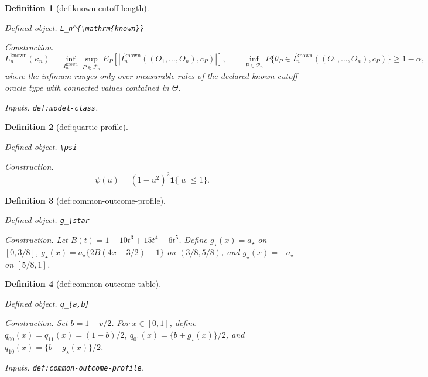\documentclass{article}
\newtheorem{definition}{Definition}
\begin{document}
\begin{definition}[def:known-cutoff-length]\label{def:known-cutoff-length}
\par\smallskip\noindent\emph{Defined object.} \texttt{L\_\allowbreak{}n\textasciicircum{}\{\textbackslash{}\allowbreak{}mathrm\{known\}\allowbreak{}\}\allowbreak{}}
\par\smallskip\noindent\emph{Construction.} \[L_n^{\mathrm{known}}(\kappa_n)=\inf_{I_n^{\mathrm{known}}}\sup_{P\in\mathcal P_n}E_P[|I_n^{\mathrm{known}}((O_1,\ldots,O_n),c_P)|],\qquad \inf_{P\in\mathcal P_n}P\{\theta_P\in I_n^{\mathrm{known}}((O_1,\ldots,O_n),c_P)\}\ge1-\alpha,\] where the infimum ranges only over measurable rules of the declared known-cutoff oracle type with connected values contained in \(\Theta\).
\par\smallskip\noindent\emph{Inputs.} \texttt{def:\allowbreak{}model-\allowbreak{}class}.
\end{definition}

\begin{definition}[def:quartic-profile]\label{def:quartic-profile}
\par\smallskip\noindent\emph{Defined object.} \texttt{\textbackslash{}\allowbreak{}psi}
\par\smallskip\noindent\emph{Construction.} \[\psi(u)=(1-u^2)^2\mathbf 1\{|u|\le1\}.\]
\end{definition}

\begin{definition}[def:common-outcome-profile]\label{def:common-outcome-profile}
\par\smallskip\noindent\emph{Defined object.} \texttt{g\_\allowbreak{}\textbackslash{}\allowbreak{}star}
\par\smallskip\noindent\emph{Construction.} Let \(B(t)=1-10t^3+15t^4-6t^5\). Define \(g_\star(x)=a_\star\) on \([0,3/8]\), \(g_\star(x)=a_\star\{2B(4x-3/2)-1\}\) on \((3/8,5/8)\), and \(g_\star(x)=-a_\star\) on \([5/8,1]\).
\end{definition}

\begin{definition}[def:common-outcome-table]\label{def:common-outcome-table}
\par\smallskip\noindent\emph{Defined object.} \texttt{q\_\allowbreak{}\{a,\allowbreak{}b\}\allowbreak{}}
\par\smallskip\noindent\emph{Construction.} Set \(b=1-v/2\).  For \(x\in[0,1]\), define \(q_{00}(x)=q_{11}(x)=(1-b)/2\), \(q_{01}(x)=\{b+g_\star(x)\}/2\), and \(q_{10}(x)=\{b-g_\star(x)\}/2\).
\par\smallskip\noindent\emph{Inputs.} \texttt{def:\allowbreak{}common-\allowbreak{}outcome-\allowbreak{}profile}.
\end{definition}
\end{document}
